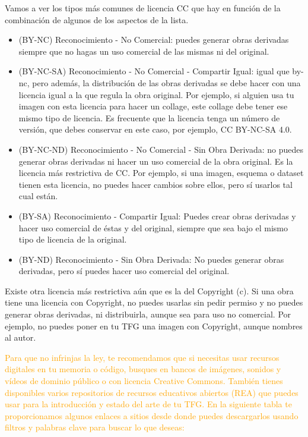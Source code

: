 \begin{naranja}
Vamos a ver los tipos más comunes de licencia CC que hay en función de la combinación de algunos de los aspectos de la lista.
\begin{itemize}
    \item (BY-NC) Reconocimiento - No Comercial: puedes generar obras derivadas siempre que no hagas un uso comercial de las mismas ni del original. 
    \item (BY-NC-SA) Reconocimiento - No Comercial - Compartir Igual: igual que by-nc, pero además, la distribución de las obras derivadas se debe hacer con una licencia igual a la que regula la obra original. Por ejemplo, si alguien usa tu imagen con esta licencia para hacer un collage, este collage debe tener ese mismo tipo de licencia. Es frecuente que la licencia tenga un número de versión, que debes conservar en este caso, por ejemplo, CC BY-NC-SA 4.0.
    \item (BY-NC-ND) Reconocimiento - No Comercial - Sin Obra Derivada:  no puedes generar obras derivadas ni hacer un uso comercial de la obra original. Es la licencia más restrictiva de CC. Por ejemplo, si una imagen, esquema o dataset tienen esta licencia, no puedes hacer cambios sobre ellos, pero sí usarlos tal cual están.
    \item (BY-SA) Reconocimiento - Compartir Igual: Puedes crear obras derivadas y hacer uso comercial de éstas y del original, siempre que sea bajo el mismo tipo de licencia de la original.
    \item  (BY-ND) Reconocimiento - Sin Obra Derivada: No puedes generar obras derivadas, pero sí puedes hacer uso comercial del original. 
\end{itemize}

Existe otra licencia más restrictiva aún que es la del Copyright (c). Si una obra tiene una licencia con Copyright, no puedes usarlas sin pedir permiso y no puedes generar obras derivadas, ni distribuirla, aunque sea para uso no comercial. Por ejemplo, no puedes poner en tu TFG una imagen con Copyright, aunque nombres al autor. 

\textcolor{orange}{Para que no infrinjas la ley, te recomendamos que si necesitas usar recursos digitales en tu memoria o código, busques en bancos de imágenes, sonidos y vídeos de dominio público o con licencia Creative Commons. También tienes disponibles varios repositorios de recursos educativos abiertos (REA) que puedes usar para la introducción y estado del arte de tu TFG. En la siguiente tabla te proporcionamos algunos enlaces a sitios desde donde puedes descargarlos usando filtros y palabras clave para buscar lo que deseas:}



\end{naranja}

